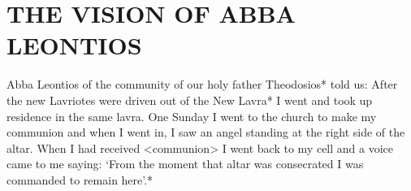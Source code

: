\chapter{THE VISION OF ABBA LEONTIOS}

Abba Leontios of the community of our holy father Theodosios* told us: After the new Lavriotes were driven out of the New Lavra* I went and took up residence in the same lavra.
One Sunday I went to the church to make my communion and when I went in, I saw an angel standing at the right side of the altar.
When I had received <communion> I went back to my cell and a voice came to me saying: `From the moment that altar was consecrated I was commanded to remain here'.*

